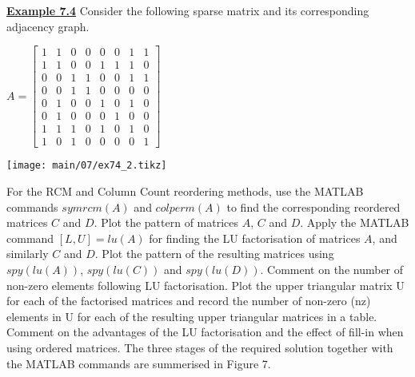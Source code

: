 \vskip 4pt
\noindent
{\bf\underline {Example 7.4}}
\vskip 2pt
\noindent
Consider the following sparse matrix and its corresponding adjacency graph.
\vskip 1pt
\noindent
\begin{table}[H]
  \begin{minipage}[b]{0.5\linewidth}
    \vskip 2pt
    $A=
		\begin{bmatrix}
      1 & 1 & 0 & 0 & 0 & 0 & 1 & 1 \\
      1 & 1 & 0 & 0 & 1 & 1 & 1 & 0 \\
      0 & 0 & 1 & 1 & 0 & 0 & 1 & 1 \\
      0 & 0 & 1 & 1 & 0 & 0 & 0 & 0 \\
      0 & 1 & 0 & 0 & 1 & 0 & 1 & 0 \\
      0 & 1 & 0 & 0 & 0 & 1 & 0 & 0 \\
      1 & 1 & 1 & 0 & 1 & 0 & 1 & 0 \\
      1 & 0 & 1 & 0 & 0 & 0 & 0 & 1
    \end{bmatrix}$
    \vspace{-5mm}
  \end{minipage}
  \begin{minipage}[b]{0.59\linewidth}
    \texttt{[image: main/07/ex74\_2.tikz]}
  \end{minipage}
\end{table}
\vskip 10pt

For the RCM and Column Count reordering methods, use the MATLAB commands
$symrcm(A)$ and $colperm(A)$ to find the corresponding reordered matrices $C$
and $D$. Plot the pattern of matrices $A$, $C$ and $D$. Apply the MATLAB command
$[L,U]=lu(A)$ for finding the LU factorisation of matrices $A$, and similarly $C$
and $D$. Plot the pattern of the resulting matrices using $spy(lu(A))$,
$spy(lu(C))$ and $spy(lu(D))$. Comment on the number of non-zero elements
following LU factorisation. Plot the upper triangular matrix U for each of the
factorised matrices and record the number of non-zero (nz) elements in U for
each of the resulting upper triangular matrices  in a table. Comment on the
advantages of the LU factorisation and the effect of fill-in when using ordered
matrices.
\rmfamily
The three stages of the required solution together with the MATLAB commands are
summerised in Figure 7.

